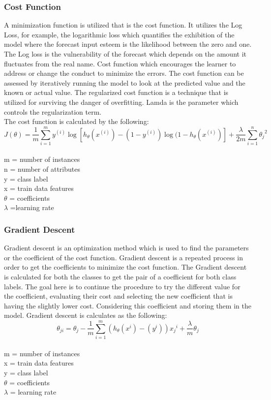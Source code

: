 \documentclass[oneside,12pt]{Classes/VTU}
\begin{document}
    	\subsubsection{Cost Function}
    		A minimization function is utilized that is the cost function. It utilizes the Log Loss, for example, the logarithmic loss which quantifies the exhibition of the model where the forecast input esteem is the likelihood between the zero and one. The Log loss is the vulnerability of the forecast which depends on the amount it fluctuates from the real name. Cost function which encourages the learner to address or change the conduct to minimize the errors. The cost function can be assessed by iteratively running the model to look at the predicted value and the known or actual value. The regularized cost function is a technique that is utilized for surviving the danger of overfitting. Lamda is the parameter which controls the regularization term.\\
    		The cost function is calculated by the following:
    		\[ J(\theta) = \frac{1}{m}\sum_{i=1}^{m} y^{(i)} \log[h_\theta(x^{(i)}) - (1-y^{(i)}) \log(1-h_\theta(x^{(i)})] + \frac{\lambda}{2m}\sum_{i=1}^{n}{\theta_j}^2 \] \\
    		m = number of instances \\
    		n = number of attributes \\
    		y = class label \\
    		x = train data features\\
    		$\theta$ = coefficients \\ 
    		$\lambda$ =learning rate
    	
    	
    	\subsubsection{Gradient Descent}
    		Gradient descent is an optimization method which is used to find 
    		the parameters or  the  coefficient  of  the  cost  function.  Gradient 
    		descent is  a  repeated  process  in  order  to  get  the  coefficients  to 
    		minimize the cost function. The  Gradient  descent  is  calculated 
    		for both the classes to get the pair of a coefficient for both class 
    		labels. The goal here is to continue the procedure to try the different 
    		value for the coefficient, evaluating their cost  and selecting the new coefficient that is having the slightly lower cost. Considering this coefficient and storing them in the model. Gradient descent 
    		is calculates as the following:
    		\[ \theta_{ji} = \theta_j - \frac{1}{m}\sum_{i=1}^{m}(h_\theta(x^i)-(y^i)) {x_j}^i + \frac{\lambda}{m} \theta_j \]\\
    		m = number of instances \\
    		x = train data features \\
    		y = class label \\
    		$\theta$ = coefficients \\
    		$\lambda$ = learning rate 
    		
\end{document}
